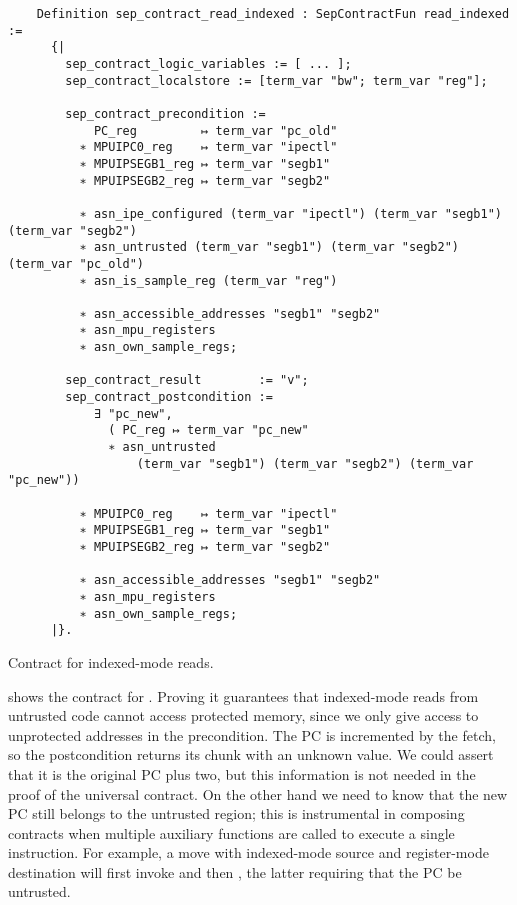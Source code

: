 \begin{listing}
  \begin{verbatim}
    Definition sep_contract_read_indexed : SepContractFun read_indexed :=
      {|
        sep_contract_logic_variables := [ ... ];
        sep_contract_localstore := [term_var "bw"; term_var "reg"];

        sep_contract_precondition :=
            PC_reg         ↦ term_var "pc_old"
          ∗ MPUIPC0_reg    ↦ term_var "ipectl"
          ∗ MPUIPSEGB1_reg ↦ term_var "segb1"
          ∗ MPUIPSEGB2_reg ↦ term_var "segb2"

          ∗ asn_ipe_configured (term_var "ipectl") (term_var "segb1") (term_var "segb2")
          ∗ asn_untrusted (term_var "segb1") (term_var "segb2") (term_var "pc_old")
          ∗ asn_is_sample_reg (term_var "reg")

          ∗ asn_accessible_addresses "segb1" "segb2"
          ∗ asn_mpu_registers
          ∗ asn_own_sample_regs;

        sep_contract_result        := "v";
        sep_contract_postcondition :=
            ∃ "pc_new",
              ( PC_reg ↦ term_var "pc_new"
              ∗ asn_untrusted
                  (term_var "segb1") (term_var "segb2") (term_var "pc_new"))

          ∗ MPUIPC0_reg    ↦ term_var "ipectl"
          ∗ MPUIPSEGB1_reg ↦ term_var "segb1"
          ∗ MPUIPSEGB2_reg ↦ term_var "segb2"

          ∗ asn_accessible_addresses "segb1" "segb2"
          ∗ asn_mpu_registers
          ∗ asn_own_sample_regs;
      |}.
  \end{verbatim}
  \caption{Contract for indexed-mode reads.}
  \label{lst:read_indexed}
\end{listing}

 shows the contract for . Proving it guarantees that indexed-mode reads from untrusted code cannot access protected memory, since we only give access to unprotected addresses in the precondition. The PC is incremented by the fetch, so the postcondition returns its chunk with an unknown value. We could assert that it is the original PC plus two, but this information is not needed in the proof of the universal contract. On the other hand we need to know that the new PC still belongs to the untrusted region; this is instrumental in composing contracts when multiple auxiliary functions are called to execute a single instruction. For example, a move with indexed-mode source and register-mode destination will first invoke  and then , the latter requiring that the PC be untrusted.

